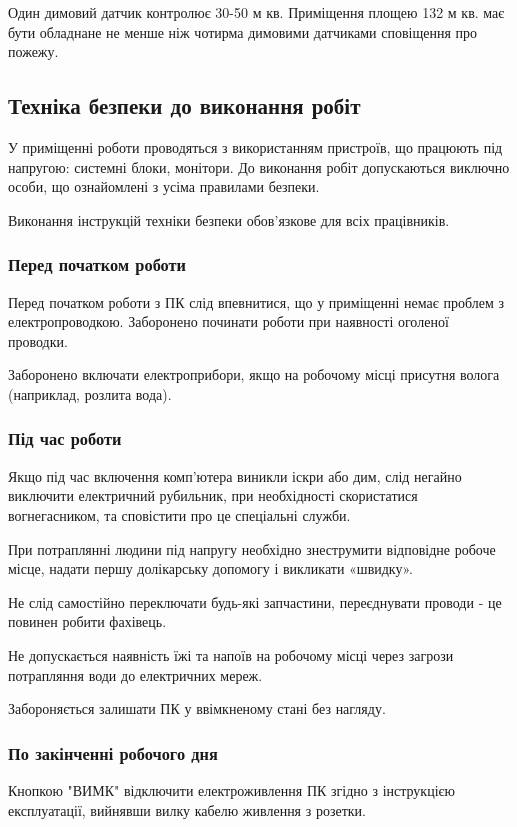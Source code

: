     Один димовий датчик контролює 30-50 м кв. Приміщення площею 132 м кв. має бути обладнане не менше ніж чотирма димовими датчиками сповіщення про пожежу.

\subsection{Техніка безпеки до виконання робіт}
    У приміщенні роботи проводяться з використанням пристроїв, що працюють під напругою: системні блоки, монітори. До виконання робіт допускаються виключно особи, що ознайомлені з усіма правилами безпеки.

    Виконання інструкцій техніки безпеки обов'язкове для всіх працівників.

    \subsubsection{Перед початком роботи}

    Перед початком роботи з ПК слід впевнитися, що у приміщенні немає проблем з електропроводкою. Заборонено починати роботи при наявності оголеної проводки.
    
    Заборонено включати електроприбори, якщо на робочому місці присутня волога (наприклад, розлита вода).
    
    \subsubsection{Під час роботи}
    Якщо під час включення комп'ютера виникли іскри або дим, слід негайно виключити електричний рубильник,
    при необхідності скористатися вогнегасником, та сповістити про це спеціальні служби.

    При потраплянні людини під напругу необхідно знеструмити відповідне робоче місце, надати першу долікарську допомогу і викликати «швидку».

    Не слід самостійно переключати будь-які запчастини, переєднувати проводи - це повинен робити фахівець.

    Не допускається наявність їжі та напоїв на робочому місці через загрози потрапляння води до електричних мереж.

    Забороняється залишати ПК у ввімкненому стані без нагляду.

    \subsubsection{По закінченні робочого дня}
    Кнопкою "ВИМК" відключити електроживлення ПК згідно з інструкцією експлуатації, вийнявши вилку кабелю живлення з розетки.

